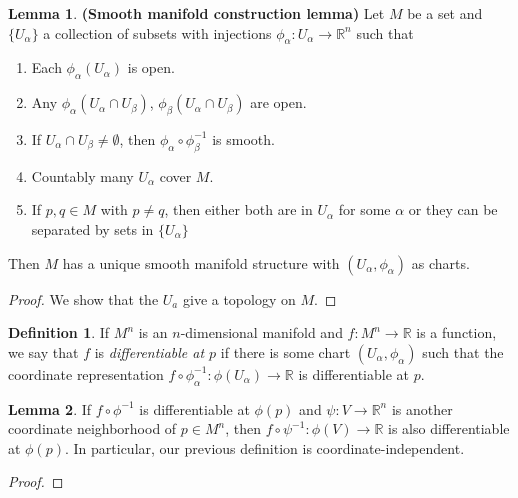 \documentclass[10pt,letterpaper,cm]{nupset}
\theoremstyle{definition}
\newtheorem*{definition}{Definition}
\newtheorem{lemma}{Lemma}
\newcommand{\R}{\mathbb R}
\newcommand{\1}{\mathbf{1}}
\newcommand{\0}{\vec 0}
\begin{document}
\begin{lemma}{\textbf{(Smooth manifold construction lemma)}}
Let $M$ be a set and $\{U_\alpha\}$ a collection of subsets with injections $\phi_\alpha : U_\alpha \to \R^n$ such that
\begin{enumerate}
\item Each $\phi_\alpha(U_\alpha)$ is open.
\item Any $\phi_\alpha(U_\alpha \cap U_\beta)$, $\phi_\beta(U_\alpha \cap U_\beta)$ are open.
\item If $U_\alpha \cap U_\beta \ne \emptyset$, then $\phi_\alpha \circ \phi_\beta^{-1}$ is smooth. 
\item Countably many $U_\alpha$ cover $M$.
\item If $p, q\in M$ with $p\ne q$, then either both are in $U_\alpha$ for some $\alpha$ or they can be separated by sets in $\{U_\alpha\}$
\end{enumerate}

Then $M$ has a unique smooth manifold structure with $(U_\alpha, \phi_\alpha)$ as charts. 
\end{lemma}

\begin{proof}
We show that the $U_a$ give a topology on $M$.
\end{proof}

\begin{definition}
If $M^n$ is an $n$-dimensional manifold and $f: M^n \to \R$ is a function, we say that $f$ is \textit{differentiable at $p$} if there is some chart $(U_\alpha, \phi_\alpha)$ such that the coordinate representation $f\circ \phi_\alpha^{-1}: \phi(U_\alpha) \to \R$ is differentiable at $p$.
\end{definition}

\begin{lemma}
If $f \circ \phi^{-1}$ is differentiable at $\phi(p)$ and $\psi: V \to \R^n$ is another coordinate neighborhood of $p\in M^n$, then $f \circ \psi^{-1}: \phi(V) \to \R$ is also differentiable at $\phi(p)$. In particular, our previous definition is coordinate-independent. 
\end{lemma}

\begin{proof}

\end{proof}
\end{document}
